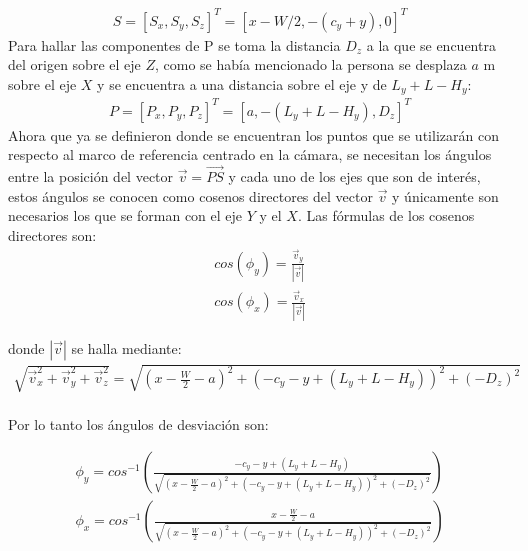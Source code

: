     \begin{eqnarray}
    S= [S_x, S_y, S_z]^T= [x-W/2, -(c_y+y), 0]^T
    \end{eqnarray}
    Para hallar las componentes de P se toma la distancia $D_z$ a la que se encuentra del origen sobre el eje $Z$, como se había mencionado la persona se desplaza $a$ m sobre el eje $X$ y se encuentra a una distancia sobre el eje y de $L_y+L-H_y$:
    \begin{eqnarray}
    P=[P_x, P_y, P_z]^T= [a, -(L_y+L-H_y), D_z]^T
    \end{eqnarray}
  Ahora que ya se definieron donde se encuentran los puntos que se utilizarán con respecto al marco de referencia centrado en la cámara, se necesitan los ángulos entre la posición del vector $\vec v=\vec {PS}$ y cada uno de los ejes que son de interés, estos ángulos se conocen como cosenos directores del vector $\vec v$ y únicamente son necesarios los que se forman con el eje $Y$ y el $X$.
  Las fórmulas de los cosenos directores son:
  \begin{eqnarray}
  cos(\phi_y)=\frac{\vec v_y}{|\vec v|}\\
  cos(\phi_x)=\frac{\vec v_x}{|\vec v|}
  \end{eqnarray}
  
  donde $|\vec v|$ se halla mediante:
  \begin{eqnarray}
  \sqrt{\vec v_{x}^2+\vec v_{y}^2+\vec v_{z}^2}=\sqrt{(x-\frac{W}{2}-a)^2+(-c_y-y+(L_y+L-H_y))^2+(-D_z)^2}
  \end{eqnarray}
  \\Por lo tanto los ángulos de desviación son:
  
  \begin{eqnarray}
  \phi_y=cos^{-1} (\frac{-c_y-y+(L_y+L-H_y)}{\sqrt{(x-\frac{W}{2}-a)^2+(-c_y-y+(L_y+L-H_y))^2+(-D_z)^2}})\\
  \phi_x=cos^{-1}(\frac{x-\frac{W}{2}-a}{\sqrt{(x-\frac{W}{2}-a)^2+(-c_y-y+(L_y+L-H_y))^2+(-D_z)^2}})
  \end{eqnarray}
